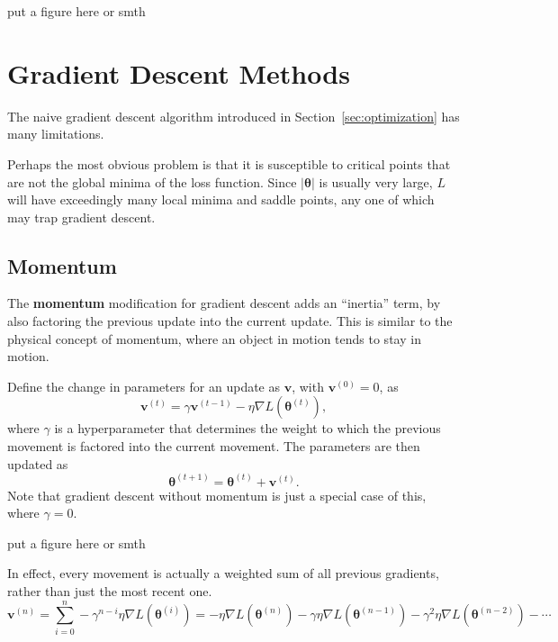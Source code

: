 \documentclass[12pt]{report}
\theoremstyle{definition}
\theoremstyle{remark}
\begin{document}
put a figure here or smth


\section{Gradient Descent Methods}\label{sec:gradient-descent-methods}

The naive gradient descent algorithm introduced in Section~\ref{sec:optimization} has many limitations.

Perhaps the most obvious problem is that it is susceptible to critical points that are not the global minima of the loss function. Since $|\boldsymbol{\theta}|$ is usually very large, $L$ will have exceedingly many local minima and saddle points, any one of which may trap gradient descent.



\subsection{Momentum}
The \textbf{momentum} modification for gradient descent adds an ``inertia'' term, by also factoring the previous update into the current update. This is similar to the physical concept of momentum, where an object in motion tends to stay in motion.

Define the change in parameters for an update as $\mathbf{v}$, with $\mathbf{v}^{(0)} = 0$, as
\begin{equation}
    \mathbf{v}^{(t)} = \gamma \mathbf{v}^{(t-1)} - \eta \nabla L(\boldsymbol{\theta}^{(t)}),
\end{equation}
where $\gamma$ is a hyperparameter that determines the weight to which the previous movement is factored into the current movement. The parameters are then updated as
\begin{equation}
    \boldsymbol{\theta}^{(t+1)} = \boldsymbol{\theta}^{(t)} + \mathbf{v}^{(t)}.
\end{equation}
Note that gradient descent without momentum is just a special case of this, where $\gamma = 0$.

put a figure here or smth

In effect, every movement is actually a weighted sum of all previous gradients, rather than just the most recent one.
\begin{equation}
    \mathbf{v}^{(n)} = \sum_{i=0}^{n} -\gamma^{n-i} \eta\nabla L(\boldsymbol{\theta}^{(i)}) = -\eta\nabla L(\boldsymbol{\theta}^{(n)}) - \gamma \eta\nabla L(\boldsymbol{\theta}^{(n-1)}) - \gamma^2 \eta\nabla L(\boldsymbol{\theta}^{(n-2)}) - \cdots
\end{equation}
\end{document}

